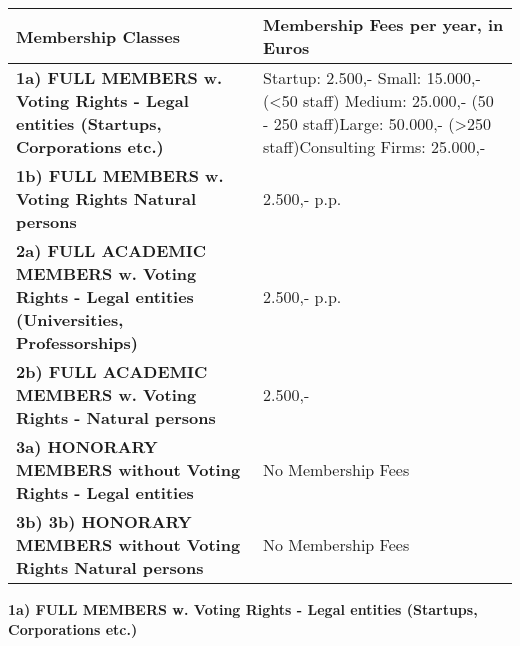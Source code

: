 \documentclass{article}
\begin{document}
\begin{longtable}{| p{} | p{} |}
	\hline
 	   \textbf{Membership Classes} & \textbf{Membership Fees per year, in Euros} \\ \hline\hline
 	   \textbf{1a) FULL MEMBERS w. Voting Rights - Legal entities (Startups, Corporations etc.)} &
	Startup: 2.500,- \newline Small: 15.000,- (\textless 50 staff) \newline Medium: 25.000,- (50 - 250 			staff)\newline Large: 50.000,- (\textgreater 250 staff)\newline Consulting Firms: 25.000,- \\
	\hline
		\textbf{1b) FULL MEMBERS w. Voting Rights Natural persons} & 2.500,- p.p. \\                                                                                                             	\hline
		\textbf{2a) FULL ACADEMIC MEMBERS w. Voting Rights - Legal entities (Universities, Professorships)} & 2.500,- p.p. \\                                                                                                             	\hline
		\textbf{2b) FULL ACADEMIC MEMBERS w. Voting Rights - Natural persons} & 2.500,- \\                                                                                                             	\hline
		\textbf{3a) HONORARY MEMBERS without Voting Rights - Legal entities} & No Membership Fees \\                                                                                                             	\hline
		\textbf{3b) 3b) HONORARY MEMBERS without Voting Rights Natural persons} & No Membership Fees \\                                                                                                            
	\hline
\end{longtable}

\textbf{1a) FULL MEMBERS w. Voting Rights - Legal entities (Startups, Corporations etc.)} \\
\end{document}
